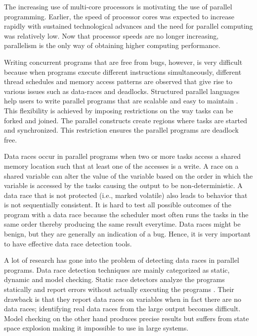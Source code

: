 The increasing use of multi-core processors is motivating the use of parallel programming. Earlier, the speed of processor cores was expected to increase rapidly with sustained technological advances and the need for parallel computing was relatively low. Now that processor speeds are no longer increasing, parallelism is the only way of obtaining higher computing performance.

Writing concurrent programs that are free from bugs, however, is very difficult because when programs execute different instructions simultaneously, different thread schedules and memory access patterns are observed that give rise to various issues such as data-races and deadlocks. Structured parallel languages help users to write parallel programs that are scalable and easy to maintain \cite{blumofe1996cilk, charles2005x10, cave2011habanero}. This flexibility is achieved by imposing restrictions on the way tasks can be forked and joined. The parallel constructs create regions where tasks are started and synchronized. This restriction ensures the parallel programs are deadlock free.

Data races occur in parallel programs when two or more tasks access a shared memory location such that at least one of the accesses is a write. A race on a shared variable can alter the value of the variable based on the order in which the variable is accessed by the tasks causing the output to be non-deterministic. A data race that is not protected (i.e., marked volatile) also leads to behavior that is not sequentially consistent. It is hard to test all possible outcomes of the program with a data race because the scheduler most often  runs the tasks in the same order thereby producing the same result everytime. Data races might be benign, but they are  generally an indication of a bug. Hence, it is very important to have effective data race detection tools.

A lot of research has gone into the problem of detecting data races in parallel programs. Data race detection techniques are mainly categorized as static, dynamic and model checking. Static race detectors analyze the programs statically and report errors without actually executing the programs \cite{engler2003racerx,ESC,abadi2006types,naik2006effective,voung2007relay,choi2001static, vechev2011automatic}. Their drawback is that they report data races on variables when in fact there are no data races; identifying real data races from the large output becomes difficult. Model checking on the other hand produces precise results but suffers from state space explosion making it impossible to use in large systems\cite{kulikov2010detecting, vakkalanka2008implementing, Godefroid, anderson2014jpf, gligoric2012x10x, zirkel2013automated}.


